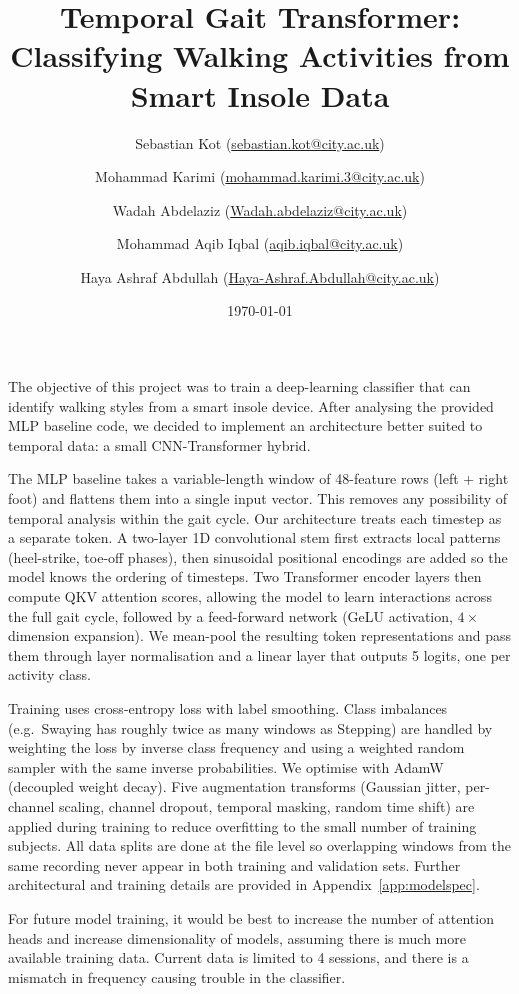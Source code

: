 \documentclass[10pt,a4paper,twocolumn]{article}
\title{Temporal Gait Transformer: Classifying Walking Activities from Smart Insole Data}
\author{
\small Sebastian Kot (\href{mailto:sebastian.kot@city.ac.uk}{sebastian.kot@city.ac.uk}) \and
\small Mohammad Karimi (\href{mailto:mohammad.karimi.3@city.ac.uk}{mohammad.karimi.3@city.ac.uk}) \and
\small Wadah Abdelaziz (\href{mailto:Wadah.abdelaziz@city.ac.uk}{Wadah.abdelaziz@city.ac.uk}) \and
\small Mohammad Aqib Iqbal (\href{mailto:aqib.iqbal@city.ac.uk}{aqib.iqbal@city.ac.uk}) \and
\small Haya Ashraf Abdullah (\href{mailto:Haya-Ashraf.Abdullah@city.ac.uk}{Haya-Ashraf.Abdullah@city.ac.uk})
}
\date{\today}
\begin{document}
\maketitle

The objective of this project was to train a deep-learning classifier that can identify walking styles from a smart insole device. After analysing the provided MLP baseline code, we decided to implement an architecture better suited to temporal data: a small CNN-Transformer hybrid.

The MLP baseline takes a variable-length window of 48-feature rows (left + right foot) and flattens them into a single input vector. This removes any possibility of temporal analysis within the gait cycle. Our architecture treats each timestep as a separate token. A two-layer 1D convolutional stem first extracts local patterns (heel-strike, toe-off phases), then sinusoidal positional encodings are added so the model knows the ordering of timesteps. Two Transformer encoder layers then compute QKV attention scores, allowing the model to learn interactions across the full gait cycle, followed by a feed-forward network (GeLU activation, $4\times$ dimension expansion). We mean-pool the resulting token representations and pass them through layer normalisation and a linear layer that outputs 5 logits, one per activity class.\newline

Training uses cross-entropy loss with label smoothing. Class imbalances (e.g.\ Swaying has roughly twice as many windows as Stepping) are handled by weighting the loss by inverse class frequency and using a weighted random sampler with the same inverse probabilities. We optimise with AdamW (decoupled weight decay). Five augmentation transforms (Gaussian jitter, per-channel scaling, channel dropout, temporal masking, random time shift) are applied during training to reduce overfitting to the small number of training subjects. All data splits are done at the file level so overlapping windows from the same recording never appear in both training and validation sets. Further architectural and training details are provided in Appendix~\ref{app:modelspec}. \newline

For future model training, it would be best to increase the number of attention heads and increase dimensionality of models, assuming there is much more available training data. Current data is limited to 4 sessions, and there is a mismatch in frequency causing trouble in the classifier.
\end{document}
